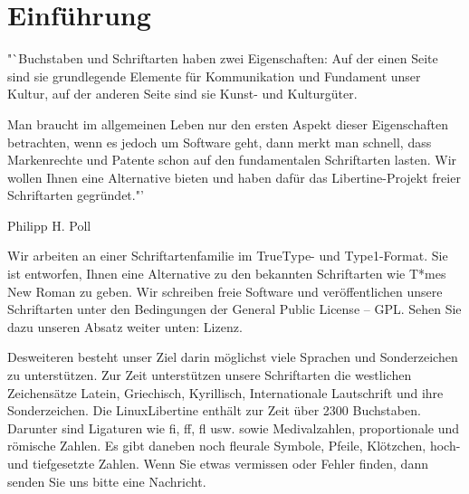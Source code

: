 %
%
%
%

\section{Einführung}

"`Buchstaben und Schriftarten haben zwei Eigenschaften: Auf der einen Seite sind
sie grundlegende
Elemente für Kommunikation und Fundament unser Kultur, auf der anderen Seite
sind sie Kunst- und Kulturgüter.

Man braucht im allgemeinen Leben nur den ersten Aspekt dieser Eigenschaften
betrachten,
wenn es jedoch um Software geht, dann merkt man schnell, dass Markenrechte und
Patente schon auf den fundamentalen Schriftarten lasten. Wir wollen Ihnen eine
Alternative bieten und haben dafür das Libertine-Projekt freier Schriftarten
gegründet."'

{\raggedleft Philipp H. Poll\par}

Wir arbeiten an einer Schriftartenfamilie im TrueType- und Type1-Format. Sie ist
entworfen, Ihnen eine Alternative zu den bekannten Schriftarten wie T*mes New
Roman zu geben. Wir schreiben freie Software und veröffentlichen unsere
Schriftarten unter den Bedingungen der General Public License -- GPL. Sehen Sie
dazu unseren Absatz weiter unten: Lizenz.

Desweiteren besteht unser Ziel darin möglichst viele Sprachen und Sonderzeichen
zu unterstützen. Zur Zeit unterstützen unsere Schriftarten die westlichen
Zeichensätze Latein, Griechisch, Kyrillisch, Internationale Lautschrift und ihre
Sonderzeichen. Die LinuxLibertine enthält zur Zeit über 2300 Buchstaben.
Darunter sind Ligaturen wie fi, ff, fl usw. sowie Medivalzahlen, proportionale
und römische Zahlen. Es gibt daneben noch fleurale Symbole, Pfeile, Klötzchen,
hoch- und tiefgesetzte Zahlen.  Wenn Sie etwas vermissen oder Fehler finden,
dann senden Sie uns bitte eine Nachricht.

\endinput
